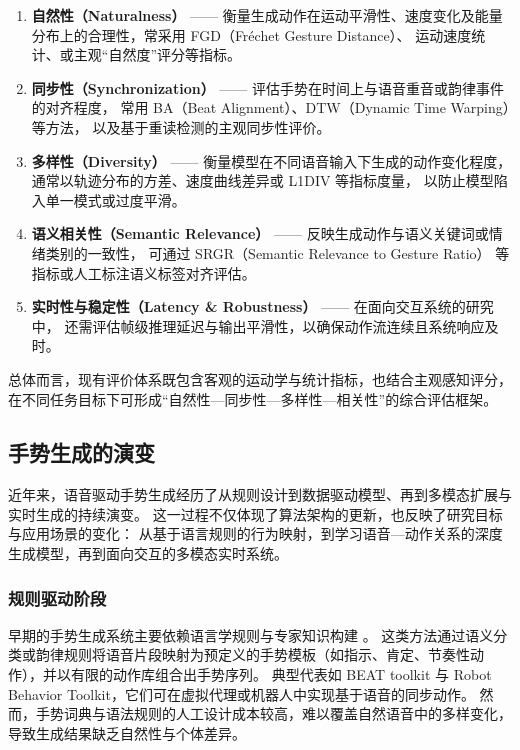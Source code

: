 \begin{enumerate}
    \item \textbf{自然性（Naturalness）} —— 衡量生成动作在运动平滑性、速度变化及能量分布上的合理性，常采用 FGD（Fréchet Gesture Distance）\cite{ginosar2019speech2gesture}、
          运动速度统计、或主观“自然度”评分等指标。
    \item \textbf{同步性（Synchronization）} —— 评估手势在时间上与语音重音或韵律事件的对齐程度，
          常用 BA（Beat Alignment）\cite{kucherenko2021predictability}、DTW（Dynamic Time Warping）等方法，
          以及基于重读检测的主观同步性评价。
    \item \textbf{多样性（Diversity）} —— 衡量模型在不同语音输入下生成的动作变化程度，
          通常以轨迹分布的方差、速度曲线差异或 L1DIV 等指标度量，
          以防止模型陷入单一模式或过度平滑。
    \item \textbf{语义相关性（Semantic Relevance）} —— 反映生成动作与语义关键词或情绪类别的一致性，
          可通过 SRGR（Semantic Relevance to Gesture Ratio）\cite{beatcamn} 等指标或人工标注语义标签对齐评估。
    \item \textbf{实时性与稳定性（Latency \& Robustness）} —— 在面向交互系统的研究中，
          还需评估帧级推理延迟与输出平滑性，以确保动作流连续且系统响应及时。
\end{enumerate}

总体而言，现有评价体系既包含客观的运动学与统计指标，也结合主观感知评分，
在不同任务目标下可形成“自然性—同步性—多样性—相关性”的综合评估框架。

\subsection{手势生成的演变}

近年来，语音驱动手势生成经历了从规则设计到数据驱动模型、再到多模态扩展与实时生成的持续演变。
这一过程不仅体现了算法架构的更新，也反映了研究目标与应用场景的变化：
从基于语言规则的行为映射，到学习语音—动作关系的深度生成模型，再到面向交互的多模态实时系统。

\subsubsection{规则驱动阶段}

早期的手势生成系统主要依赖语言学规则与专家知识构建 \cite{behavior_expression_animation_toolkit,robot_behavior_toolkit,gesture_generation_by_imitation,gesture_and_speech_in_interaction}。
这类方法通过语义分类或韵律规则将语音片段映射为预定义的手势模板（如指示、肯定、节奏性动作），并以有限的动作库组合出手势序列。
典型代表如 BEAT toolkit 与 Robot Behavior Toolkit，它们可在虚拟代理或机器人中实现基于语音的同步动作。
然而，手势词典与语法规则的人工设计成本较高，难以覆盖自然语音中的多样变化，导致生成结果缺乏自然性与个体差异。

